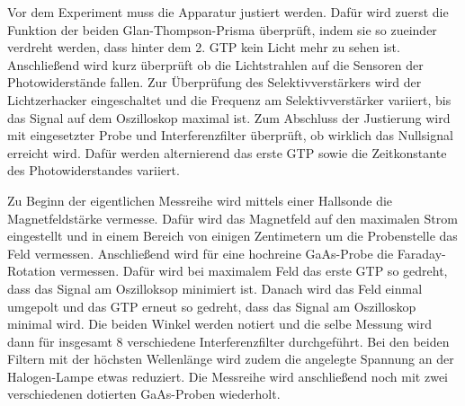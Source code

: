 Vor dem Experiment muss die Apparatur justiert werden. Dafür wird zuerst die Funktion
der beiden Glan-Thompson-Prisma überprüft, indem sie so zueinder verdreht werden,
dass hinter dem 2. GTP kein Licht mehr zu sehen ist. Anschließend wird kurz überprüft
ob die Lichtstrahlen auf die Sensoren der Photowiderstände fallen. Zur Überprüfung
des Selektivverstärkers wird der Lichtzerhacker eingeschaltet und die Frequenz
am Selektivverstärker variiert, bis das Signal auf dem Oszilloskop maximal ist.
Zum Abschluss der Justierung wird mit eingesetzter Probe und Interferenzfilter
überprüft, ob wirklich das Nullsignal erreicht wird. Dafür werden alternierend
das erste GTP sowie die Zeitkonstante des Photowiderstandes variiert.

Zu Beginn der eigentlichen Messreihe wird mittels einer Hallsonde die Magnetfeldstärke
vermesse. Dafür wird das Magnetfeld auf den maximalen Strom eingestellt und in einem
Bereich von einigen Zentimetern um die Probenstelle das Feld vermessen. Anschließend
wird für eine hochreine GaAs-Probe die Faraday-Rotation vermessen. Dafür wird
bei maximalem Feld das erste GTP so gedreht, dass das Signal am Oszilloksop
minimiert ist. Danach wird das Feld einmal umgepolt und das GTP erneut so gedreht,
dass das Signal am Oszilloskop minimal wird. Die beiden Winkel werden notiert und
die selbe Messung wird dann für insgesamt 8 verschiedene Interferenzfilter
durchgeführt. Bei den beiden Filtern mit der höchsten Wellenlänge wird zudem
die angelegte Spannung an der Halogen-Lampe etwas reduziert. Die Messreihe wird
anschließend noch mit zwei verschiedenen dotierten GaAs-Proben wiederholt.
